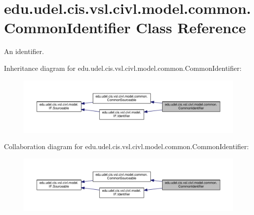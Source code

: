 \hypertarget{classedu_1_1udel_1_1cis_1_1vsl_1_1civl_1_1model_1_1common_1_1CommonIdentifier}{}\section{edu.\+udel.\+cis.\+vsl.\+civl.\+model.\+common.\+Common\+Identifier Class Reference}
\label{classedu_1_1udel_1_1cis_1_1vsl_1_1civl_1_1model_1_1common_1_1CommonIdentifier}


An identifier.  




Inheritance diagram for edu.\+udel.\+cis.\+vsl.\+civl.\+model.\+common.\+Common\+Identifier\+:
\nopagebreak
\begin{figure}[H]
\begin{center}
\leavevmode
\includegraphics[width=350pt]{classedu_1_1udel_1_1cis_1_1vsl_1_1civl_1_1model_1_1common_1_1CommonIdentifier__inherit__graph}
\end{center}
\end{figure}


Collaboration diagram for edu.\+udel.\+cis.\+vsl.\+civl.\+model.\+common.\+Common\+Identifier\+:
\nopagebreak
\begin{figure}[H]
\begin{center}
\leavevmode
\includegraphics[width=350pt]{classedu_1_1udel_1_1cis_1_1vsl_1_1civl_1_1model_1_1common_1_1CommonIdentifier__coll__graph}
\end{center}
\end{figure}
